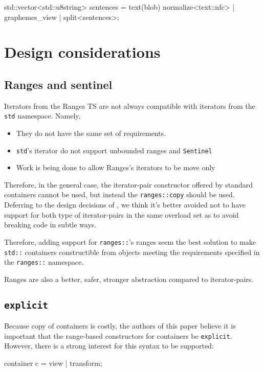 \documentclass{wg21}
\newcommand{\cc}[1]{\texttt{#1}}
\begin{document}
\begin{codeblock}
    std::vector<std::u8string> sentences =
        text(blob)
        normalize<text::nfc> |
        graphemes_view |
        split<sentences>;
\end{codeblock}

\section{Design considerations}


\subsection{Ranges and sentinel}

Iterators from the Ranges TS are not always compatible with iterators from the \cc{std} namespace.
Namely,
\begin{itemize}
    \item They do not have the same set of requirements.
    \item \cc{std}'s iterator do not support unbounded ranges and \cc{Sentinel}
    \item Work is being done to allow Ranges's iterators to be move only
\end{itemize}

Therefore, in the general case, the iterator-pair constructor offered by standard containers cannot be used, but instead the \cc{ranges::copy} should be used.
Deferring to the design decisions of \cite{P0896R3}, we think it's better avoided not to have support for both type of iterator-pairs in the same overload set
as to avoid breaking code in subtle ways.

Therefore, adding support for \cc{ranges::}'s ranges seem the best solution to make \cc{std::} containers constructible from objects meeting the requirements
specified in the \cc{ranges::} namespace.

Ranges are also a better, safer, stronger abstraction compared to iterator-pairs.

\subsection{\cc{explicit}}

Because copy of containers is costly, the authors of this paper believe it is important that the range-based constructors for containers be \cc{explicit}.
However, there is a strong interest for this syntax to be supported:
\begin{codeblock}
    container c = view | transform;
\end{codeblock}
\end{document}
